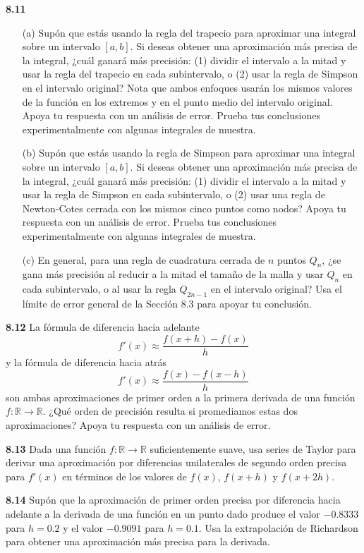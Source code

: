\documentclass{article}
\begin{document}
\textbf{8.11}
\begin{itemize}
    \item[(a)] Supón que estás usando la regla del trapecio para aproximar una integral sobre un intervalo \([a, b]\). Si deseas obtener una aproximación más precisa de la integral, ¿cuál ganará más precisión: (1) dividir el intervalo a la mitad y usar la regla del trapecio en cada subintervalo, o (2) usar la regla de Simpson en el intervalo original? Nota que ambos enfoques usarán los mismos valores de la función en los extremos y en el punto medio del intervalo original. Apoya tu respuesta con un análisis de error. Prueba tus conclusiones experimentalmente con algunas integrales de muestra.
    \item[(b)] Supón que estás usando la regla de Simpson para aproximar una integral sobre un intervalo \([a, b]\). Si deseas obtener una aproximación más precisa de la integral, ¿cuál ganará más precisión: (1) dividir el intervalo a la mitad y usar la regla de Simpson en cada subintervalo, o (2) usar una regla de Newton-Cotes cerrada con los mismos cinco puntos como nodos? Apoya tu respuesta con un análisis de error. Prueba tus conclusiones experimentalmente con algunas integrales de muestra.
    \item[(c)] En general, para una regla de cuadratura cerrada de \(n\) puntos \(Q_n\), ¿se gana más precisión al reducir a la mitad el tamaño de la malla y usar \(Q_n\) en cada subintervalo, o al usar la regla \(Q_{2n-1}\) en el intervalo original? Usa el límite de error general de la Sección 8.3 para apoyar tu conclusión.
\end{itemize}

\textbf{8.12} La fórmula de diferencia hacia adelante
\[
f'(x) \approx \frac{f(x + h) - f(x)}{h}
\]
y la fórmula de diferencia hacia atrás
\[
f'(x) \approx \frac{f(x) - f(x-h)}{h}
\]
son ambas aproximaciones de primer orden a la primera derivada de una función \(f : \mathbb{R} \to \mathbb{R}\). ¿Qué orden de precisión resulta si promediamos estas dos aproximaciones? Apoya tu respuesta con un análisis de error.

\textbf{8.13} Dada una función \(f: \mathbb{R} \to \mathbb{R}\) suficientemente suave, usa series de Taylor para derivar una aproximación por diferencias unilaterales de segundo orden precisa para \(f'(x)\) en términos de los valores de \(f(x)\), \(f(x+h)\) y \(f(x+2h)\).

\textbf{8.14} Supón que la aproximación de primer orden precisa por diferencia hacia adelante a la derivada de una función en un punto dado produce el valor \(-0.8333\) para \(h = 0.2\) y el valor \(-0.9091\) para \(h = 0.1\). Usa la extrapolación de Richardson para obtener una aproximación más precisa para la derivada.
\end{document}
